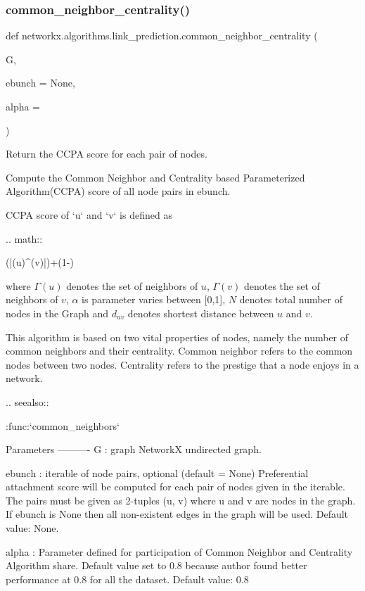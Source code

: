 \subsubsection{\texorpdfstring{common\+\_\+neighbor\+\_\+centrality()}{common\_neighbor\_centrality()}}
{\footnotesize\ttfamily def networkx.\+algorithms.\+link\+\_\+prediction.\+common\+\_\+neighbor\+\_\+centrality (\begin{DoxyParamCaption}\item[{}]{G,  }\item[{}]{ebunch = {\ttfamily None},  }\item[{}]{alpha = {} }\end{DoxyParamCaption})}

\begin{DoxyVerb}Return the CCPA score for each pair of nodes.

Compute the Common Neighbor and Centrality based Parameterized Algorithm(CCPA)
score of all node pairs in ebunch.

CCPA score of `u` and `v` is defined as

.. math::

    \alpha \cdot (|\Gamma (u){\cap }^{}\Gamma (v)|)+(1-\alpha )\cdot {}

where $\Gamma(u)$ denotes the set of neighbors of $u$, $\Gamma(v)$ denotes the
set of neighbors of $v$, $\alpha$ is  parameter varies between [0,1], $N$ denotes
total number of nodes in the Graph and ${d}_{uv}$ denotes shortest distance
between $u$ and $v$.

This algorithm is based on two vital properties of nodes, namely the number
of common neighbors and their centrality. Common neighbor refers to the common
nodes between two nodes. Centrality refers to the prestige that a node enjoys
in a network.

.. seealso::

    :func:`common_neighbors`

Parameters
----------
G : graph
    NetworkX undirected graph.

ebunch : iterable of node pairs, optional (default = None)
    Preferential attachment score will be computed for each pair of
    nodes given in the iterable. The pairs must be given as
    2-tuples (u, v) where u and v are nodes in the graph. If ebunch
    is None then all non-existent edges in the graph will be used.
    Default value: None.

alpha : Parameter defined for participation of Common Neighbor
        and Centrality Algorithm share. Default value set to 0.8
        because author found better performance at 0.8 for all the
        dataset.
        Default value: 0.8



\end{DoxyVerb}
